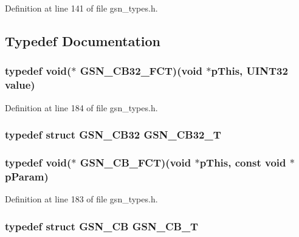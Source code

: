 Definition at line 141 of file gsn\_\-types.h.



\subsection{Typedef Documentation}
\hypertarget{a00599_ab4bad69dbb3955c389ce748612ed9ba4}{
\subsubsection[{GSN\_\-CB32\_\-FCT}]{\setlength{\rightskip}{0pt plus 5cm}typedef void($\ast$ {\bf GSN\_\-CB32\_\-FCT})(void $\ast$pThis, {\bf UINT32} value)}}
\label{a00599_ab4bad69dbb3955c389ce748612ed9ba4}


Definition at line 184 of file gsn\_\-types.h.

\hypertarget{a00599_ad6498a464c109edb4fb99f43db8ae490}{
\subsubsection[{GSN\_\-CB32\_\-T}]{\setlength{\rightskip}{0pt plus 5cm}typedef struct {\bf GSN\_\-CB32}  {\bf GSN\_\-CB32\_\-T}}}
\label{a00599_ad6498a464c109edb4fb99f43db8ae490}
\hypertarget{a00599_ac4c0c28469f0b55f25aa4c54e7eefdc2}{
\subsubsection[{GSN\_\-CB\_\-FCT}]{\setlength{\rightskip}{0pt plus 5cm}typedef void($\ast$ {\bf GSN\_\-CB\_\-FCT})(void $\ast$pThis, const void $\ast$pParam)}}
\label{a00599_ac4c0c28469f0b55f25aa4c54e7eefdc2}


Definition at line 183 of file gsn\_\-types.h.

\hypertarget{a00599_a7db24ea278c4ee3f84be794922ac3014}{
\subsubsection[{GSN\_\-CB\_\-T}]{\setlength{\rightskip}{0pt plus 5cm}typedef struct {\bf GSN\_\-CB}  {\bf GSN\_\-CB\_\-T}}}
\label{a00599_a7db24ea278c4ee3f84be794922ac3014}
